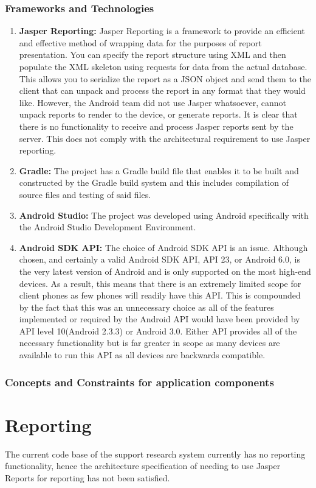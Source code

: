 \documentclass[a4paper,10pt]{article}
\begin{document}
    \subsubsection{Frameworks and Technologies}
    \begin{enumerate}
    	\item \textbf{Jasper Reporting: }Jasper Reporting is a framework to provide an efficient and effective method of wrapping data for the purposes of report presentation. You can specify the report structure using XML and then populate the XML skeleton using requests for data from the actual database. This allows you to serialize the report as a JSON object and send them to the client that can unpack and process the report in any format that they would like. However, the Android team did not use Jasper whatsoever, cannot unpack reports to render to the device, or generate reports. It is clear that there is no functionality to receive and process Jasper reports sent by the server. This does not comply with the architectural requirement to use Jasper reporting.
    	\item \textbf{Gradle: } The project has a Gradle build file that enables it to be built and constructed by the Gradle build system and this includes compilation of source files and testing of said files.
    	\item \textbf{Android Studio: } The project was developed using Android specifically with the Android Studio Development Environment.
    	\item \textbf{Android SDK API: } The choice of Android SDK API is an issue. Although chosen, and certainly a valid Android SDK API, API 23, or Android 6.0, is the very latest version of Android and is only supported on the most high-end devices. As a result, this means that there is an extremely limited scope for client phones as few phones will readily have this API. This is compounded by the fact that this was an unnecessary choice as all of the features implemented or required by the Android API would have been provided by API level 10(Android 2.3.3) or Android 3.0. Either API provides all of the necessary functionality but is far greater in scope as many devices are available to run this API as all devices are backwards compatible. 
    \end{enumerate}
    \subsubsection{Concepts and Constraints for application components}



\section{Reporting}
The current code base of the support research system currently has no reporting functionality, hence the architecture specification of needing to use Jasper Reports for reporting has not been satisfied.
\end{document}
